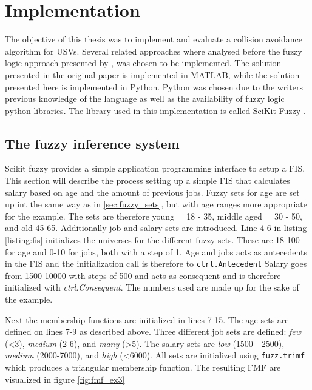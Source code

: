 

\chapter{Implementation}

The objective of this thesis was to implement and evaluate a  collision avoidance  algorithm for USVs. Several related approaches where analysed before the fuzzy logic approach presented by \textcite{perera2012intelligent}, was chosen to be implemented.
The solution presented in the original paper is implemented in MATLAB, while the solution presented here is implemented in Python. Python was chosen due to the writers previous knowledge of the language as well as the availability of fuzzy logic python libraries. The library used in this implementation is called SciKit-Fuzzy \cite{josh_warner_2017_1002946}.

\section{The fuzzy inference system}
Scikit fuzzy provides a simple application programming interface to setup a FIS. This section will describe the process setting up a simple FIS that calculates salary based on age and the amount of previous jobs. Fuzzy sets for age are set up int the same way as in \ref{sec:fuzzy_sets}, but with age ranges more appropriate for the example. The sets are therefore young = 18 - 35, middle aged = 30 - 50, and old 45-65.  Additionally job and salary sets are introduced. Line 4-6 in listing \ref{listing:fis} initializes the universes for the different fuzzy sets. These are 18-100 for age and 0-10 for jobs, both with a step of 1. Age and jobs acts as antecedents in the FIS and the initialization call is therefore to  \texttt{ctrl.Antecedent} Salary goes from 1500-10000 with steps of 500 and acts as consequent and is therefore initialized with  \textit{ctrl.Consequent}. The numbers used are made up for the sake of the example.

Next the membership functions are initialized in lines 7-15. The age sets are defined  on lines 7-9 as described above.
Three different job sets are defined: \textit{few} (<3),  \textit{medium} (2-6), and \textit{many} (>5). The salary sets are \textit{low} (1500 - 2500),  \textit{medium} (2000-7000), and \textit{high} (<6000). All sets are initialized using \texttt{fuzz.trimf} which produces a triangular membership function. The resulting FMF are visualized in figure \ref{fig:fmf_ex3}

